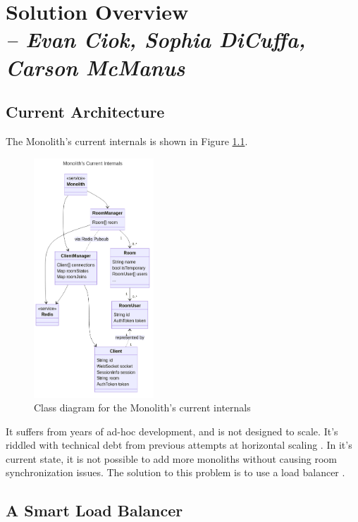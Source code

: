 \chapter{Solution Overview \\
  \small{\textit{-- Evan Ciok, Sophia DiCuffa, Carson McManus}}
  \label{Chapter::SolutionOverview}}

\section{Current Architecture}

The Monolith's  current internals is shown in Figure \ref{fig:monolith-class-current}.

\begin{figure}[!h]
  \centering
  \includegraphics[width=0.4\textwidth]{Figures/monolith-class-current.png}
  \caption{Class diagram for the Monolith's current internals}
  \label{fig:monolith-class-current}
\end{figure}

It suffers from years of ad-hoc development, and is not designed to scale. It's riddled with technical debt from previous attempts at horizontal scaling . In it's current state, it is not possible to add more monoliths without causing room synchronization issues. The solution to this problem is to use a load balancer .

\section{A Smart Load Balancer}

